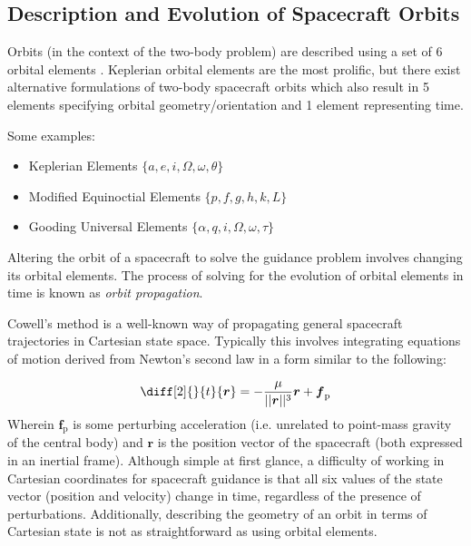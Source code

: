\subsection{Description and Evolution of Spacecraft Orbits}

Orbits (in the context of the two-body problem) are described using a set of 6 orbital elements \cite{book:1487513}. Keplerian orbital elements are the most prolific, but there exist alternative formulations of two-body spacecraft orbits which also result in 5 elements specifying orbital geometry/orientation and 1 element representing time.

Some examples:
\begin{itemize}
  \item Keplerian Elements $\{a, e, i, \Omega, \omega, \theta\}$
  \item Modified Equinoctial Elements $\{p, f, g, h, k, L\}$ \cite{walker1985set}
  \item Gooding Universal Elements  $\{\alpha, q, i, \Omega, \omega, \tau\}$ \cite{gooding_universal_elements}
\end{itemize}

Altering the orbit of a spacecraft to solve the guidance problem involves changing its orbital elements. The process of solving for the evolution of orbital elements in time is known as \textit{orbit propagation}.

Cowell's method \cite{book:1487513} is a well-known way of propagating general spacecraft trajectories in Cartesian state space. Typically this involves integrating equations of motion derived from Newton's second law in a form similar to the following:

\begin{equation}
  \diff[2]{}{t}{\boldsymbol{r}} = -\frac{\mu}{||\boldsymbol{r}||^3} \boldsymbol{r} + \boldsymbol{f}_\mathrm{p} \label{eq:cowells_method}
\end{equation}
Wherein $\boldsymbol{f}_\mathrm{p}$ is some perturbing acceleration (i.e. unrelated to point-mass gravity of the central body) and $\boldsymbol{r}$ is the position vector of the spacecraft (both expressed in an inertial frame). Although simple at first glance, a difficulty of working in Cartesian coordinates for spacecraft guidance is that all six values of the state vector (position and velocity) change in time, regardless of the presence of perturbations. Additionally, describing the geometry of an orbit in terms of Cartesian state is not as straightforward as using orbital elements.

